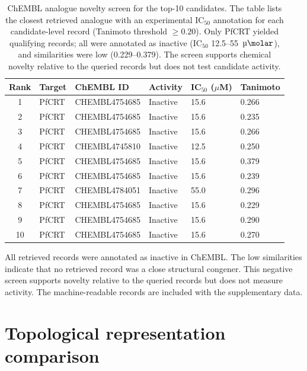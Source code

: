 \documentclass[11pt,a4paper]{article}
\begin{document}
\begin{table}[htbp]
\centering
\caption{ChEMBL analogue novelty screen for the top-10 candidates. The table lists the closest retrieved analogue with an experimental IC$_{50}$ annotation for each candidate-level record (Tanimoto threshold $\geq 0.20$). Only PfCRT yielded qualifying records; all were annotated as inactive (IC$_{50}$ 12.5--55~$\si{\micro\molar}$), and similarities were low (0.229--0.379). The screen supports chemical novelty relative to the queried records but does not test candidate activity.}
\label{tab:chembl_validation_top10}
\small
\begin{tabularx}{\textwidth}{c l l l l l}
\toprule
Rank & Target & ChEMBL ID & Activity & {IC$_{50}$ ($\mu$M)} & Tanimoto \\
\midrule
1 & PfCRT & CHEMBL4754685 & Inactive & 15.6 & 0.266 \\
2 & PfCRT & CHEMBL4754685 & Inactive & 15.6 & 0.235 \\
3 & PfCRT & CHEMBL4754685 & Inactive & 15.6 & 0.266 \\
4 & PfCRT & CHEMBL4745810 & Inactive & 12.5 & 0.250 \\
5 & PfCRT & CHEMBL4754685 & Inactive & 15.6 & 0.379 \\
6 & PfCRT & CHEMBL4754685 & Inactive & 15.6 & 0.239 \\
7 & PfCRT & CHEMBL4784051 & Inactive & 55.0 & 0.296 \\
8 & PfCRT & CHEMBL4754685 & Inactive & 15.6 & 0.229 \\
9 & PfCRT & CHEMBL4754685 & Inactive & 15.6 & 0.290 \\
10 & PfCRT & CHEMBL4754685 & Inactive & 15.6 & 0.270 \\
\bottomrule
\end{tabularx}
\vspace{1mm}
\footnotesize All retrieved records were annotated as inactive in ChEMBL. The low similarities indicate that no retrieved record was a close structural congener. This negative screen supports novelty relative to the queried records but does not measure activity. The machine-readable records are included with the supplementary data.
\end{table}



\section{Topological representation comparison}
\label{SM-sec:sota_benchmark}
\end{document}
